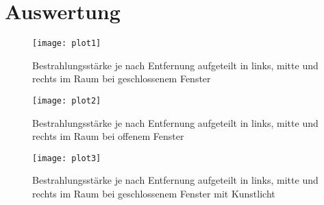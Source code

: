 \section{Auswertung}
\label{sec:Auswertung}
\begin{figure}[ht]
    \centering
    \texttt{[image: plot1]}
    \caption{Bestrahlungsstärke je nach Entfernung aufgeteilt in links, mitte und rechts im Raum bei geschlossenem Fenster}
    \label{fig:plot1_28062023}
  \end{figure}
  \begin{figure}[ht]
    \centering
    \texttt{[image: plot2]}
    \caption{Bestrahlungsstärke je nach Entfernung aufgeteilt in links, mitte und rechts im Raum bei offenem Fenster}
    \label{fig:plot2_28062023}
  \end{figure}
  \begin{figure}[H]
    \centering
    \texttt{[image: plot3]}
    \caption{Bestrahlungsstärke je nach Entfernung aufgeteilt in links, mitte und rechts im Raum bei geschlossenem Fenster mit Kunstlicht}
    \label{fig:plot3_28062023}
  \end{figure}